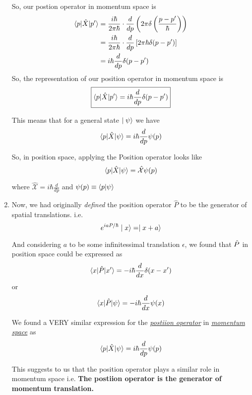 \documentclass[twoside]{article}
\begin{document}
\begin{enumerate}
   So, our postion operator in momentum space is 
   \begin{align*}
      \langle p | \hat{X}|p' \rangle &= \frac{i\hbar}{2\pi\hbar} \cdot \frac{d}{dp} \left( 2\pi\delta\left(\frac{p-p'}{\hbar}\right) \right) \\
                            &= \frac{i\hbar}{2\pi\hbar} \cdot \frac{d}{dp} \left[ 2\pi\hbar\delta(p-p') \right] \\
                            &= i\hbar \frac{d}{dp} \delta(p-p')
   \end{align*}
   So, the representation of our position operator in momentum space is 
   \[ \boxed{ \langle p | \hat{X}|p' \rangle = i\hbar \frac{d}{dp} \delta(p-p') } \]

   This means that for a general state $\mid\psi\rangle$ we have 
   \[ \langle p | \hat{X}|\psi \rangle = i\hbar \frac{d}{dp} \psi(p) \]

   So, in position space, applying the Position operator looks like 
   \[ \langle p | \hat{X}|\psi \rangle = \hat{\mathcal{X}}\psi(p) \]

   where $\hat{\mathcal{X}} = i\hbar \frac{d}{dp}$ and $\psi(p) \equiv \langle p | \psi \rangle$

   \item Now, we had originally \emph{defined} the position operator $\hat{P}$ to be the generator of spatial translations. i.e. 
   \[ e^{iaP/\hbar}\mid x\rangle = \mid x+a\rangle \]

   And considering $a$ to be some infinitessimal translation $\epsilon$, we found that $\hat{P}$ in position space could be expressed as 
   \[ \langle x | \hat{P}|x' \rangle = -i\hbar\frac{d}{dx} \delta(x-x') \]
   or 
   \[ \langle x | \hat{P}|\psi \rangle = -i\hbar\frac{d}{dx} \psi(x) \]

   We found a VERY similar expression for the \underline{\emph{postiion operator}} in \underline{\emph{momentum space}} as 
   \[ \langle p | \hat{X}|\psi \rangle = i\hbar \frac{d}{dp} \psi(p) \]

   This suggests to us that the position operator plays a similar role in momentum space i.e. \textbf{The postiion operator is the generator of momentum translation.}





\end{enumerate}
\end{document}
